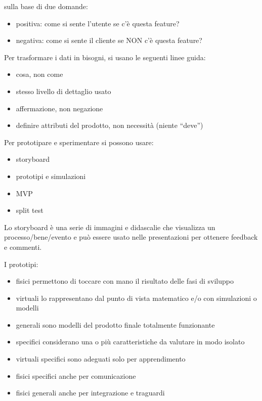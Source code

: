 \documentclass[answers, a4paper, 11pt]{exam}
\begin{document}
sulla base di due domande:
\begin{itemize}
    \item positiva: come si sente l'utente se c'è questa feature?
    \item negativa: come si sente il cliente se NON c'è questa feature?
\end{itemize}

Per trasformare i dati in bisogni, si usano le seguenti linee guida:
\begin{itemize}
    \item cosa, non come
    \item stesso livello di dettaglio usato
    \item affermazione, non negazione
    \item definire attributi del prodotto, non necessità (niente ``deve'')
\end{itemize}

Per prototipare e sperimentare si possono usare:
\begin{itemize}
    \item storyboard
    \item prototipi e simulazioni
    \item MVP
    \item split test
\end{itemize}

Lo storyboard è una serie di immagini e didascalie che visualizza un processo/bene/evento e può essere usato nelle presentazioni per ottenere feedback e commenti.

I prototipi:

\begin{itemize}
    \item fisici permettono di toccare con mano il risultato delle fasi di sviluppo
    \item virtuali lo rappresentano dal punto di vista matematico e/o con simulazioni o modelli
    \item generali sono modelli del prodotto finale totalmente funzionante
    \item specifici considerano una o più caratteristiche da valutare in modo isolato
    \item virtuali specifici sono adeguati solo per apprendimento
    \item fisici specifici anche per comunicazione
    \item fisici generali anche per integrazione e traguardi
\end{itemize}
\end{document}
